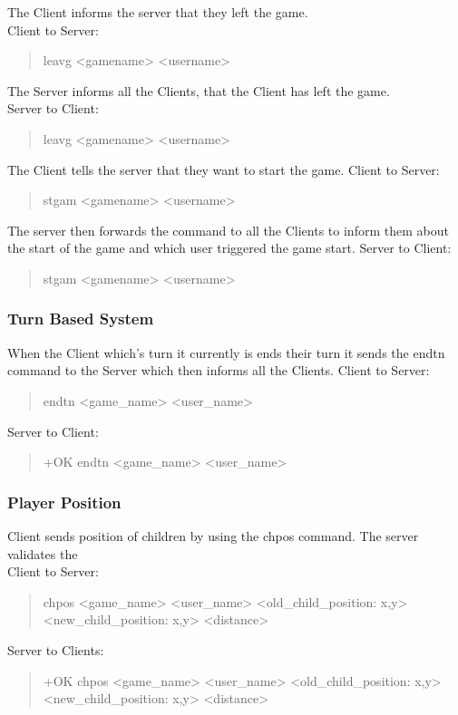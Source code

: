 \documentclass[a4paper,11pt]{article}
\begin{document}
\noindent
The Client informs the server that they left the game.\\
Client to Server:
\begin{quote}
  leavg <gamename> <username>
\end{quote}

\noindent
The Server informs all the Clients, that the Client has left the game.\\
Server to Client:
\begin{quote}
  leavg <gamename> <username>
\end{quote}

\noindent
The Client tells the server that they want to start the game.
Client to Server:
\begin{quote}
  stgam <gamename> <username>
\end{quote}

\noindent
The server then forwards the command to all the Clients to inform them about the start of the game and which user triggered the game start.
Server to Client:
\begin{quote}
  stgam <gamename> <username>
\end{quote}


\subsubsection{Turn Based System}
When the Client which's turn it currently is ends their turn it sends the endtn command to the Server which then informs all the Clients.
Client to Server:
\begin{quote}
  endtn <game\_name> <user\_name>
\end{quote}
Server to Client:
\begin{quote}
  +OK endtn <game\_name> <user\_name>
\end{quote}

\subsubsection{Player Position}
Client sends position of children by using the chpos command. The server validates the \\
Client to Server:
\begin{quote}
  chpos <game\_name> <user\_name> <old\_child\_position: x,y> <new\_child\_position: x,y> <distance>
\end{quote}
\noindent
Server to Clients:
\begin{quote}
  +OK chpos <game\_name> <user\_name> <old\_child\_position: x,y> <new\_child\_position: x,y> <distance>
\end{quote}
\clearpage  
\end{document}
